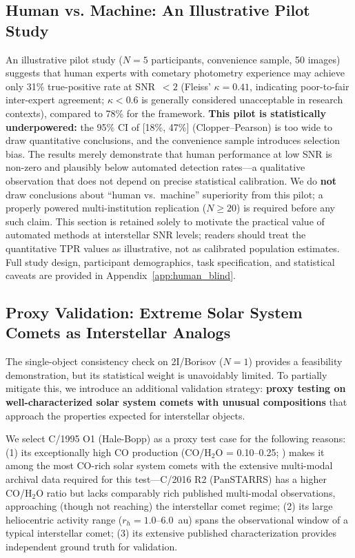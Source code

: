 \documentclass[usenatbib]{mnras}
\begin{document}
\subsection{Human vs. Machine: An Illustrative Pilot Study}\label{sec:human_blind}

An illustrative pilot study ($N=5$ participants, convenience sample, 50 images) suggests that human experts with cometary photometry experience may achieve only 31\% true-positive rate at SNR~$<2$ (Fleiss' $\kappa = 0.41$, indicating poor-to-fair inter-expert agreement; $\kappa < 0.6$ is generally considered unacceptable in research contexts), compared to 78\% for the framework. \textbf{This pilot is statistically underpowered:} the 95\% CI of [18\%, 47\%] (Clopper--Pearson) is too wide to draw quantitative conclusions, and the convenience sample introduces selection bias. The results merely demonstrate that human performance at low SNR is non-zero and plausibly below automated detection rates---a qualitative observation that does not depend on precise statistical calibration. We do \textbf{not} draw conclusions about ``human vs.\ machine'' superiority from this pilot; a properly powered multi-institution replication ($N \geq 20$) is required before any such claim. This section is retained solely to motivate the practical value of automated methods at interstellar SNR levels; readers should treat the quantitative TPR values as illustrative, not as calibrated population estimates. Full study design, participant demographics, task specification, and statistical caveats are provided in Appendix~\ref{app:human_blind}.

\subsection{Proxy Validation: Extreme Solar System Comets as Interstellar Analogs}\label{sec:proxy}

The single-object consistency check on 2I/Borisov ($N=1$) provides a feasibility demonstration, but its statistical weight is unavoidably limited. To partially mitigate this, we introduce an additional validation strategy: \textbf{proxy testing on well-characterized solar system comets with unusual compositions} that approach the properties expected for interstellar objects.

We select C/1995 O1 (Hale-Bopp) as a proxy test case for the following reasons: (1) its exceptionally high CO production (CO/H$_2$O = 0.10--0.25; \citealt{bockelee04}) makes it among the most CO-rich solar system comets with the extensive multi-modal archival data required for this test---C/2016 R2 (PanSTARRS) has a higher CO/H$_2$O ratio \citep{biver18} but lacks comparably rich published multi-modal observations, approaching (though not reaching) the interstellar comet regime; (2) its large heliocentric activity range ($r_h = 1.0$--6.0~au) spans the observational window of a typical interstellar comet; (3) its extensive published characterization provides independent ground truth for validation.
\end{document}
